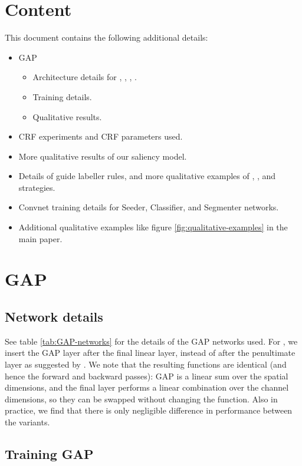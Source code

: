 \documentclass[british,10pt,twocolumn,letterpaper]{article}
\begin{document}
\section{\label{sec:supp-content}Content}

This document contains the following additional details:
\begin{itemize}
\item GAP

\begin{itemize}
\item Architecture details for , ,
, .
\item Training details.
\item Qualitative results.
\end{itemize}
\item CRF experiments and CRF parameters used.
\item More qualitative results of our saliency model.
\item Details of  guide labeller rules, and more qualitative
examples of , , and 
strategies.
\item Convnet training details for Seeder, Classifier, and Segmenter networks.
\item Additional qualitative examples like figure \ref{fig:qualitative-examples} in the main paper.
\end{itemize}


\section{\label{sec:supp-gap}GAP}

\subsection{\label{sec:supp-gap-net}Network details}

See table \ref{tab:GAP-networks} for the details of the GAP networks
used. For , we insert the GAP layer
after the final linear layer, instead of after the penultimate layer
as suggested by \cite{zhou2015cnnlocalization}. We note that the
resulting functions are identical (and hence the forward and backward
passes): GAP is a linear sum over the spatial dimensions, and the
final layer performs a linear combination over the channel dimensions,
so they can be swapped without changing the function. Also in practice,
we find that there is only negligible difference in performance between
the variants.


\subsection{\label{sec:supp-gap-train}Training GAP}
\end{document}
